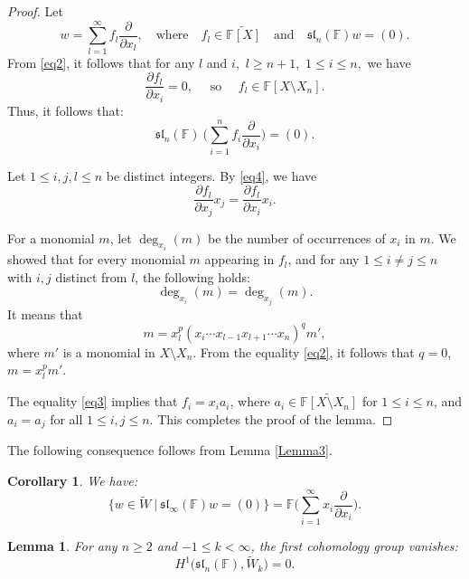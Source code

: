 \documentclass[12pt,a4paper]{amsart}
\theoremstyle{plain}
\newtheorem{Lemma}{Lemma}
\newtheorem{Corollary}{Corollary}
\begin{document}
	
	\begin{proof} Let 	\[
		w = \sum_{l=1}^{\infty} f_l \frac{\partial}{\partial x_l}, \quad \text{where} \quad f_l \in \widetilde{\mathbb{F}[X]} \quad \text{and} \quad \mathfrak{sl}_n(\mathbb{F}) w = (0) .
		\] From \eqref{eq2}, it follows that for any $l$ and $i,$ $l \geq n+1,$ $1 \leq i \leq n, $ we have
		\[
		\frac{\partial f_l}{\partial x_i} = 0, \quad  \text{ so } \quad f_l \in \mathbb{F}[X \setminus X_n].
		\]
		Thus, it follows that:
		\begin{equation}\label{eq4+}
			\mathfrak{sl}_n(\mathbb{F}) \ \Big(\sum_{i=1}^{n} f_i \frac{\partial}{\partial x_i} \Big) = (0).\end{equation}
		
		Let $1\leq i, j, l \leq n$ be distinct integers. By \eqref{eq4}, we have $$ \frac{\partial f_l}{\partial x_j} x_j =\frac{\partial f_l}{\partial x_i} x_i .$$
		
		
		For a monomial $m$, let $\deg_{x_i}(m)$ be the number of occurrences of $x_i$ in $m$. We showed that for every monomial $m$ appearing in $f_l$, and for any $1 \leq i \neq j \leq n$ with  $i, j$ distinct from $l$, the following holds:
		\[
		\deg_{x_i}(m) = \deg_{x_j}(m).
		\]
		It means that $$m = x_l^p (x_i \cdots x_{l-1} x_{l+1}  \cdots x_n)^q m',$$ where $m'$ is a monomial in $X \setminus X_n$. From the equality \eqref{eq2}, it follows that $q = 0$, $m = x_l^p m'$.
		
		The equality \eqref{eq3} implies that $f_i = x_i a_i$, where $a_i \in \widetilde{\mathbb{F}[X \setminus X_n]}$ for $1 \leq i \leq n$, and $a_i = a_j$ for all $1 \leq i, j \leq n$. This completes the proof of the lemma. \end{proof}
	
	The following consequence follows from Lemma \ref{Lemma3}.
	
	\begin{Corollary}\label{cor2} We have: $$ \big\{ w\in \widetilde{W} \ \big| \ \mathfrak{sl}_{\infty}(\mathbb{F}) w =(0) \big\}= \mathbb{F}\Big(\sum_{i=1}^{\infty} x_i \frac{\partial}{\partial x_i}\Big).$$ \end{Corollary}
	
	
	
	\begin{Lemma}\label{Lemma4} For any $n \geq 2$ and $-1 \leq k < \infty$, the first cohomology group vanishes:
		\[
		H^1\big(\mathfrak{sl}_n(\mathbb{F}), \widetilde{W}_k\big) = 0.
		\] \end{Lemma}
	
\end{document}
